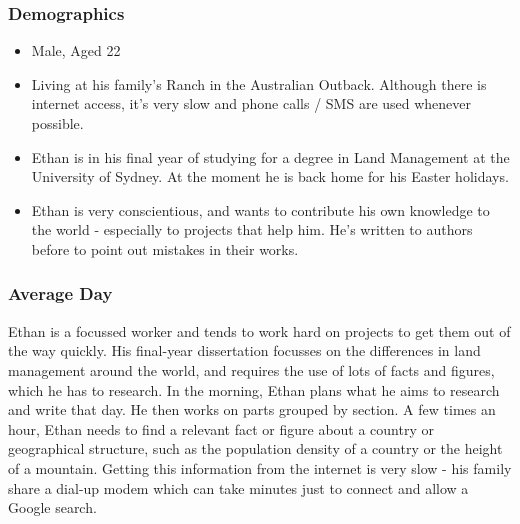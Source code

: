 \documentclass{article}
\begin{document}
\subsubsection{Demographics}
\begin{itemize}
  \item Male, Aged 22
  \item Living at his family's Ranch in the Australian Outback.  Although there is internet access, it's very slow and phone calls / SMS are used whenever possible.
  \item Ethan is in his final year of studying for a degree in Land Management at the University of Sydney.  At the moment he is back home for his Easter holidays.
    \item Ethan is very conscientious, and wants to contribute his own knowledge to the world - especially to projects that help him.  He's written to authors before to point out mistakes in their works.
\end{itemize}
\subsubsection{Average Day}
Ethan is a focussed worker and tends to work hard on projects to get them out of the way quickly.  His final-year dissertation focusses on the differences in land management around the world, and requires the use of lots of facts and figures, which he has to research.  In the morning, Ethan plans what he aims to research and write that day.  He then works on parts grouped by section.  A few times an hour, Ethan needs to find a relevant fact or figure about a country or geographical structure, such as the population density of a country or the height of a mountain.  Getting this information from the internet is very slow - his family share a dial-up modem which can take minutes just to connect and allow a Google search.
\end{document}

